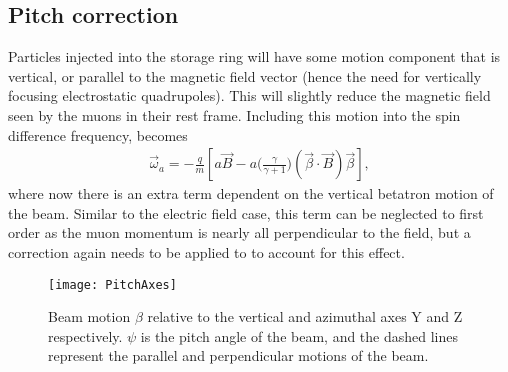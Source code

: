 


\subsection{Pitch correction}
\label{sub:pitch_correction}

Particles injected into the \gmtwo storage ring will have some motion component that is vertical, or parallel to the magnetic field vector (hence the need for vertically focusing electrostatic quadrupoles). This will slightly reduce the magnetic field seen by the muons in their rest frame. Including this motion into the spin difference frequency, \wa becomes
        \begin{align} \label{eq:wapitch}
            \vec{\omega}_{a} = -\frac{q}{m} [a\vec{B} - a \Big(\frac{\gamma}{\gamma+1}\Big)(\vec{\beta} \cdot \vec{B})\vec{\beta}],
        \end{align}
where now there is an extra term dependent on the vertical betatron motion of the beam. Similar to the electric field case, this term can be neglected to first order as the muon momentum is nearly all perpendicular to the field, but a correction again needs to be applied to \wa to account for this effect.

\begin{figure}[]
    \centering
    \texttt{[image: PitchAxes]}
    \caption[Pitching beam motion]{Beam motion $\beta$ relative to the vertical and azimuthal axes Y and Z respectively. $\psi$ is the pitch angle of the beam, and the dashed lines represent the parallel and perpendicular motions of the beam.}   
    \label{fig:PitchAxes}
\end{figure}

